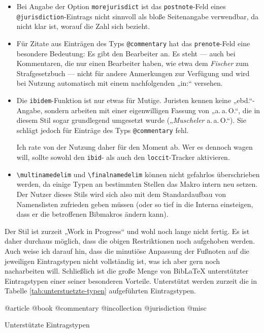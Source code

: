 \documentclass[11pt,a4paper,DIV=calc]{scrartcl}
\newcommand\software[1]{\textsf{#1}}
\newcommand\Biblatex{\software{Bib\LaTeX{}}\xspace}
\begin{document}
\begin{itemize}
\item Bei Angabe der Option \verb+morejurisdict+ ist das
  \verb+postnote+-Feld eines \verb+@jurisdiction+-Eintrags nicht
  sinnvoll als bloße Seitenangabe verwendbar, da nicht klar ist,
  worauf die Zahl sich bezieht.
\item Für Zitate aus Einträgen des Typs \verb+@commentary+ hat das
  \verb+prenote+-Feld eine besondere Bedeutung: Es gibt den Bearbeiter
  an. Es steht — auch bei Kommentaren, die nur einen Bearbeiter haben,
  wie etwa dem \emph{Fischer} zum Strafgesetzbuch — nicht für andere
  Anmerkungen zur Verfügung und wird bei Nutzung automatisch mit einem
  nachfolgenden „in:“ versehen.
\item Die \verb+ibidem+-Funktion ist nur etwas für Mutige. Juristen
  kennen keine „ebd.“-Angabe, sondern arbeiten mit einer eigenwilligen
  Fassung von „a.\,a.\,O.“, die in diesem Stil sogar grundlegend umgesetzt
  wurde („\textit{Muscheler} a.\,a.\,O.“). Sie schlägt jedoch für Einträge
  des Typs \verb+@commentary+ fehl.

  Ich rate von der Nutzung daher für den Moment ab. Wer es dennoch
  wagen will, sollte sowohl den \verb+ibid+- als auch den
  \verb+loccit+-Tracker aktivieren.
\item \verb+\multinamedelim+ und \verb+\finalnamedelim+ können nicht
  gefahrlos überschrieben werden, da einige Typen an bestimmten
  Stellen das Makro intern neu setzen. Der Nutzer dieses Stils wird
  sich also mit dem Standardaufbau von Namenslisten zufrieden geben
  müssen (oder so tief in die Interna einsteigen, dass er die
  betroffenen Bibmakros ändern kann).
\end{itemize}

Der Stil ist zurzeit „Work in Progress“ und wohl noch lange nicht
fertig. Es ist daher durchaus möglich, dass die obigen Restriktionen
noch aufgehoben werden. Auch weise ich darauf hin, dass die minutiöse
Anpassung der Fußnoten auf die jeweiligen Eintragstypen nicht
vollständig ist, was ich aber gern noch nacharbeiten will. Schließlich
ist die große Menge von \Biblatex unterstützter Eintragstypen einer
seiner besonderen Vorteile. Unterstützt werden zurzeit die in Tabelle
\ref{tab:unterstuetzte-typen} aufgeführten Eintragstypen.

\begin{table}
  \centering\ttfamily

  @article @book @commentary @incollection @jurisdiction @misc

  \caption{Unterstützte Eintragstypen}
  \label{tab:unterstuetzte-typen}
\end{table}
\end{document}
